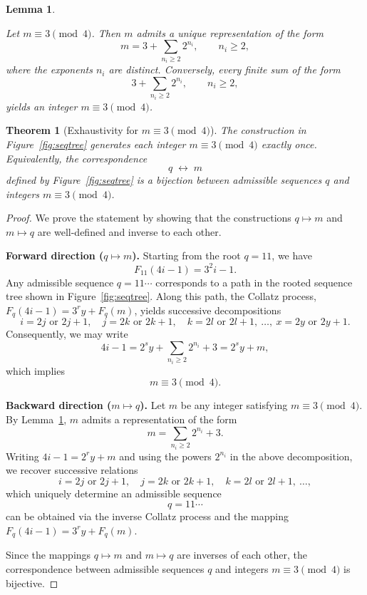 \documentclass[10pt,a4paper]{amsart}
\newtheorem{lemma}{Lemma}
\newtheorem{theorem}{Theorem}
\begin{document}
\begin{lemma}\label{lem:3mod4}

Let $m \equiv 3 \pmod{4}$. Then $m$ admits a unique representation of the form
$$ m = 3 + \sum_{n_i\ge2} 2^{n_i}, \qquad n_i \ge 2, $$
where the exponents $n_i$ are distinct. Conversely, every finite sum of the form
$$ 3 + \sum_{n_i\ge2} 2^{n_i}, \qquad n_i \ge 2,$$
yields an integer $m \equiv 3 \pmod{4}$.

\end{lemma}

\begin{theorem}[Exhaustivity for $m \equiv 3 \pmod{4}$]\label{thm:exhaustive}
	The construction in Figure~\ref{fig:seqtree} generates each integer
	$m \equiv 3 \pmod{4}$ exactly once. Equivalently, the correspondence
	\[
	q \;\longleftrightarrow\; m
	\]
	defined by Figure~\ref{fig:seqtree} is a bijection between admissible sequences $q$
	and integers $m \equiv 3 \pmod{4}$.
\end{theorem}

\begin{proof}
	We prove the statement by showing that the constructions
	$q \mapsto m$ and $m \mapsto q$ are well-defined and inverse to each other.
	
	\medskip
	\noindent\textbf{Forward direction ($q \mapsto m$).}
	Starting from the root $q = 11$, we have
	\[
	F_{11}(4i - 1) = 3^{2} i - 1.
	\]
	Any admissible sequence $q = 11\cdots$ corresponds to a path in the rooted
	sequence tree shown in Figure~\ref{fig:seqtree}. Along this path, the Collatz
	process, $F_q(4i - 1)=3^ry+F_q(m)$, yields successive decompositions
	\[
	i = 2j \text{ or } 2j + 1,\quad
	j = 2k \text{ or } 2k + 1,\quad
	k = 2l \text{ or } 2l + 1,\ \ldots,\ 
	x = 2y \text{ or } 2y + 1.
	\]
	Consequently, we may write
	\[
	4i - 1 = 2^{s} y + \sum_{n_i \ge 2} 2^{n_i} + 3
	= 2^{s} y + m,
	\]
	which implies
	\[
	m \equiv 3 \pmod{4}.
	\]
	
	\medskip
	\noindent\textbf{Backward direction ($m \mapsto q$).}
	Let $m$ be any integer satisfying $m \equiv 3 \pmod{4}$. By
	Lemma~\ref{lem:3mod4}, $m$ admits a representation of the form
	\[
	m = \sum_{n_i \ge 2} 2^{n_i} + 3.
	\]
	Writing $4i - 1 = 2^ry + m$ and using the powers $2^{n_i}$ in the above decomposition,
	we recover successive relations
	\[
	i = 2j \text{ or } 2j + 1,\quad
	j = 2k \text{ or } 2k + 1,\quad
	k = 2l \text{ or } 2l + 1,\ \ldots,
	\]
	which uniquely determine an admissible sequence
	\[
	q = 11\cdots
	\]
	can be obtained via the inverse Collatz process and the mapping $F_q(4i - 1)=3^ry+F_q(m)$.
	
	\medskip
	Since the mappings $q \mapsto m$ and $m \mapsto q$ are inverses of each other,
	the correspondence between admissible sequences $q$ and integers
	$m \equiv 3 \pmod{4}$ is bijective.
\end{proof}
\end{document}
